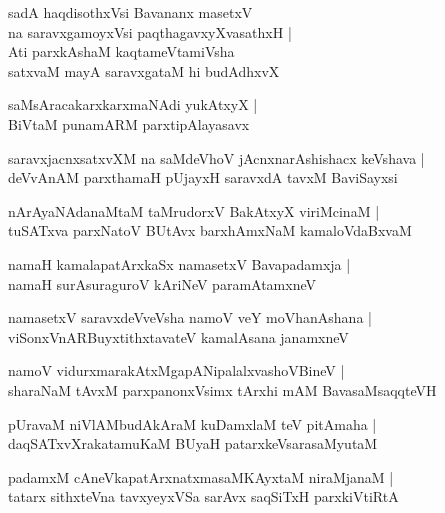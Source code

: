 \begin{shloka}
sadA haqdisothxVsi Bavananx masetxV \\
na saravxgamoyxVsi paqthagavxyXvasathxH |\\
Ati parxkAshaM kaqtameVtamiVsha\\
satxvaM mayA saravxgataM hi budAdhxvX
\end{shloka}

\begin{shloka}
saMsAracakarxkarxmaNAdi yukAtxyX |\\
BiVtaM punamARM parxtipAlayasavx
\end{shloka}

\begin{shloka}
saravxjacnxsatxvXM na saMdeVhoV jAcnxnarAshishacx keVshava |\\
deVvAnAM parxthamaH pUjayxH saravxdA tavxM BaviSayxsi
\end{shloka}

\begin{shloka}
nArAyaNAdanaMtaM taMrudorxV BakAtxyX viriMcinaM |\\
tuSATxva parxNatoV BUtAvx barxhAmxNaM kamaloVdaBxvaM
\end{shloka}

\begin{shloka}
namaH kamalapatArxkaSx namasetxV Bavapadamxja |\\
namaH surAsuraguroV kAriNeV paramAtamxneV 
\end{shloka}

\begin{shloka}
namasetxV saravxdeVveVsha namoV veY moVhanAshana |\\
viSonxVnARBuyxtithxtavateV kamalAsana janamxneV 
\end{shloka}

\begin{shloka}
namoV vidurxmarakAtxMgapANipalalxvashoVBineV |\\
sharaNaM tAvxM parxpanonxVsimx tArxhi mAM BavasaMsaqqteVH
\end{shloka}

\begin{shloka}
pUravaM niVlAMbudAkAraM kuDamxlaM teV pitAmaha |\\
daqSATxvXrakatamuKaM BUyaH patarxkeVsarasaMyutaM 
\end{shloka}

\begin{shloka}
padamxM cAneVkapatArxnatxmasaMKAyxtaM niraMjanaM |\\
tatarx sithxteVna tavxyeyxVSa sarAvx saqSiTxH parxkiVtiRtA 
\end{shloka}

